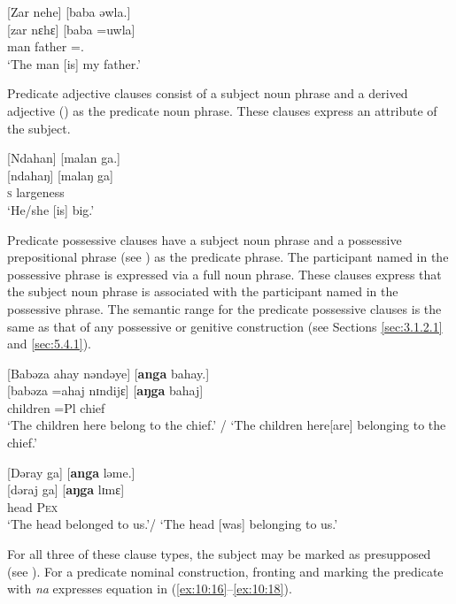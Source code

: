 \ea \label{ex:10:12}
{}[Zar  nehe]  [baba  əwla.]\\
\gll  {}[zar   nɛhɛ]    [baba   =uwla]\\
      man    {\DEM}    father  ={\oneS}.{\POSS}\\
\glt  ‘The man [is] my father.’ 
\z

Predicate adjective clauses consist of a subject noun phrase and a derived adjective %
() as the predicate noun phrase. These clauses express an attribute of the subject.

\ea \label{ex:10:13}
{}[Ndahan]  [malan  ga.]\\
\gll  {}[ndahaŋ]  [malaŋ ga]\\
      \textsc{s}    largeness  {\ADJ}\\
\glt  ‘He/she [is] big.’
\z

Predicate possessive clauses have a subject noun phrase and a possessive prepositional phrase (see ) as the predicate phrase. The participant named in the possessive phrase is expressed via a full noun phrase. These clauses express that the subject noun phrase is associated with the participant named in the possessive phrase. The semantic range for the predicate possessive clauses is the same as that of any possessive or genitive construction (see Sections \ref{sec:3.1.2.1} and \ref{sec:5.4.1}).

\ea \label{ex:10:14}
{} [Babəza  ahay  nəndəye]  [\textbf{anga}  bahay.]\\
\gll  {}[babəza  =ahaj  nɪndijɛ]    [\textbf{aŋga}  bahaj]\\
      children  =Pl  {\DEM}    {\POSS}  chief\\
\glt  ‘The children here belong to the chief.’ / ‘The children here[are] belonging to the chief.’ 
\z

\ea \label{ex:10:15}
{}[Dəray  ga]  [\textbf{anga}  ləme.]\\
\gll  {}[dəraj  ga]    [\textbf{aŋga}  lɪmɛ]\\
      head  {\ADJ}    {\POSS}  \textsc{Pex}\\
\glt  ‘The head belonged to us.’/ ‘The head [was] belonging to us.’ 
\z

For all three of these clause types, the subject may be marked as presupposed (see ). For a predicate nominal construction, fronting and marking the predicate with \textit{na} expresses equation in (\ref{ex:10:16}--\ref{ex:10:18}).

